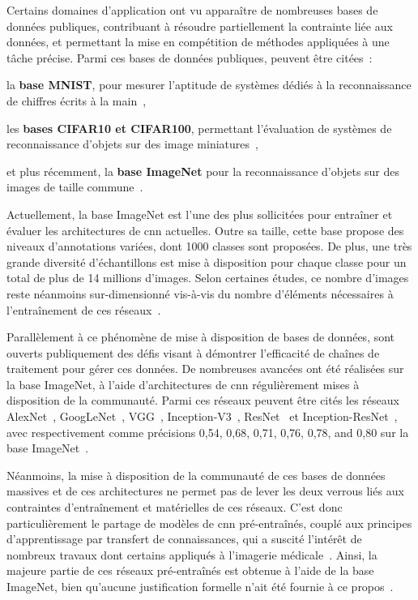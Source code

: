 Certains domaines d'application ont vu apparaître de nombreuses bases de données publiques, contribuant à résoudre partiellement la contrainte liée aux données, et permettant la mise en compétition de méthodes appliquées à une tâche précise. Parmi ces bases de données publiques, peuvent être citées~: 
\begin{inlinerate}
    \item la \textbf{base MNIST}, pour mesurer l'aptitude de systèmes dédiés à la reconnaissance de chiffres écrits à la main~\cite{lecun2010},
    \item les \textbf{bases CIFAR10 et CIFAR100}, permettant l'évaluation de systèmes de reconnaissance d'objets sur des image miniatures~\cite{Krizhevsky}, 
    \item et plus récemment, la \textbf{base ImageNet} pour la reconnaissance d'objets sur des images de taille commune~\cite{Deng2008}. 
\end{inlinerate}\par

Actuellement, la base ImageNet est l'une des plus sollicitées pour entraîner et évaluer les architectures de \gls{cnn} actuelles. Outre sa taille, cette base propose des niveaux d'annotations variées, dont 1000 classes sont proposées. De plus, une très grande diversité d'échantillons est mise à disposition pour chaque classe pour un total de plus de 14 millions d'images. Selon certaines études, ce nombre d'images reste néanmoins sur-dimensionné vis-à-vis du nombre d'éléments nécessaires à l'entraînement de ces réseaux~\cite{Huh2016}.\par

Parallèlement à ce phénomène de mise à disposition de bases de données, sont ouverts publiquement des défis visant à démontrer l'efficacité de chaînes de traitement pour gérer ces données. De nombreuses avancées ont été réalisées sur la base ImageNet, à l'aide d'architectures de \gls{cnn} régulièrement mises à disposition de la communauté. Parmi ces réseaux peuvent être cités les réseaux AlexNet~\cite{Krizhevsky2012}, GoogLeNet~\cite{Szegedy2015}, VGG~\cite{Simonyan2014}, Inception-V3~\cite{Szegedy2016}, ResNet~\cite{He2016} et Inception-ResNet~\cite{Szegedy2017}, avec respectivement comme précisions 0,54, 0,68, 0,71, 0,76, 0,78, and 0,80 sur la base ImageNet~\cite{Canziani2016}.\par

Néanmoins, la mise à disposition de la communauté de ces bases de données massives et de ces architectures ne permet pas de lever les deux verrous liés aux contraintes d'entraînement et matérielles de ces réseaux. C'est donc particulièrement le partage de modèles de \gls{cnn} pré-entraînés, couplé aux principes d'apprentissage par transfert de connaissances, qui a suscité l'intérêt de nombreux travaux dont certains appliqués à l'imagerie médicale~\cite{Litjens2017}. Ainsi, la majeure partie de ces réseaux pré-entraînés est obtenue à l'aide de la base ImageNet, bien qu'aucune justification formelle n'ait été fournie à ce propos~\cite{Huh2016}.\par
 
